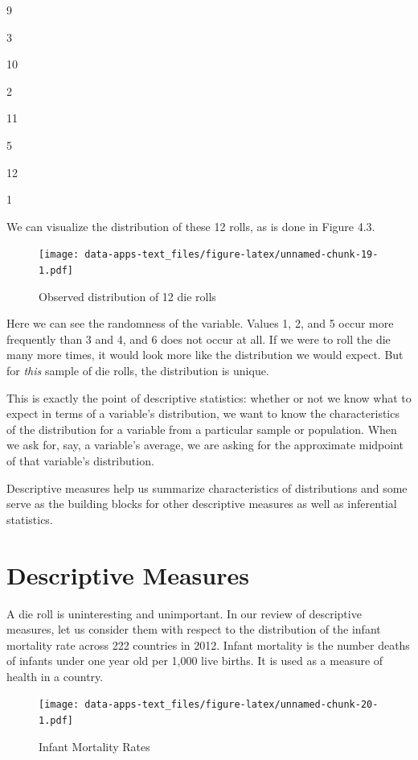 \documentclass[
]{book}
\begin{document}
9

3

10

2

11

5

12

1

We can visualize the distribution of these 12 rolls, as is done in Figure 4.3.

\begin{figure}
\centering
\texttt{[image: data-apps-text\_files/figure-latex/unnamed-chunk-19-1.pdf]}
\caption{\label{fig:unnamed-chunk-19}Observed distribution of 12 die rolls}
\end{figure}

Here we can see the randomness of the variable. Values 1, 2, and 5 occur more frequently than 3 and 4, and 6 does not occur at all. If we were to roll the die many more times, it would look more like the distribution we would expect. But for \emph{this} sample of die rolls, the distribution is unique.

This is exactly the point of descriptive statistics: whether or not we know what to expect in terms of a variable's distribution, we want to know the characteristics of the distribution for a variable from a particular sample or population. When we ask for, say, a variable's average, we are asking for the approximate midpoint of that variable's distribution.

Descriptive measures help us summarize characteristics of distributions and some serve as the building blocks for other descriptive measures as well as inferential statistics.

\hypertarget{descriptive-measures}{%
\section{Descriptive Measures}\label{descriptive-measures}}

A die roll is uninteresting and unimportant. In our review of descriptive measures, let us consider them with respect to the distribution of the infant mortality rate across 222 countries in 2012. Infant mortality is the number deaths of infants under one year old per 1,000 live births. It is used as a measure of health in a country.

\begin{figure}
\centering
\texttt{[image: data-apps-text\_files/figure-latex/unnamed-chunk-20-1.pdf]}
\caption{\label{fig:unnamed-chunk-20}Infant Mortality Rates}
\end{figure}
\end{document}
